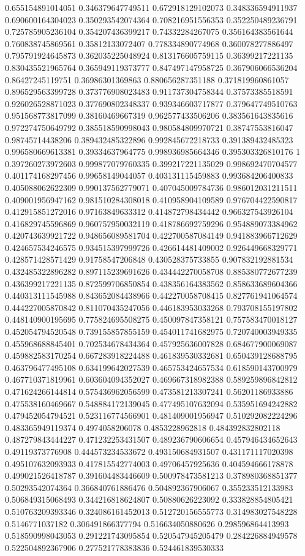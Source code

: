 \begin{table}
\begin{tabu}
\begin{sparkline}{10}
0.655154891014051 0.346379647749511 0.672918129102073 0.348336594911937 0.690600164304023 0.350293542074364 0.708216951556353 0.352250489236791 0.725785905236104 0.354207436399217 0.74332284267075 0.356164383561644 0.760838745869561 0.35812133072407 0.778334890774968 0.360078277886497 0.795791924645873 0.362035225048924 0.813176605759115 0.36399217221135 0.830435521965764 0.365949119373777 0.847497147958725 0.367906066536204 0.86427245119751 0.36986301369863 0.880656287351188 0.371819960861057 0.896529563399728 0.373776908023483 0.911737304758344 0.37573385518591 0.926026528871023 0.377690802348337 0.939346603717877 0.379647749510763 0.951568773817099 0.38160469667319 0.962577433506206 0.383561643835616 0.972274750649792 0.385518590998043 0.980584809970721 0.38747553816047 0.98745714438206 0.389432485322896 0.992845672218733 0.391389432485323 0.996580669613381 0.39334637964775 0.998936985664346 0.395303326810176 1 0.397260273972603 0.999877079760335 0.399217221135029 0.998692470704577 0.401174168297456 0.99658149044057 0.403131115459883 0.993684206400833 0.405088062622309 0.990137562779071 0.407045009784736 0.986012031211511 0.409001956947162 0.981510284308018 0.410958904109589 0.976704422590817 0.412915851272016 0.97163849633312 0.414872798434442 0.966327543926104 0.416829745596869 0.960757950032119 0.418786692759296 0.954889073384962 0.420743639921722 0.948656089581704 0.422700587084149 0.941883966712629 0.424657534246575 0.934515397999726 0.426614481409002 0.926449668329771 0.428571428571429 0.91758547206848 0.430528375733855 0.907832192881534 0.432485322896282 0.897115239691626 0.434442270058708 0.885380772677239 0.436399217221135 0.872599706850854 0.438356164383562 0.858633689604366 0.440313111545988 0.843652084438966 0.442270058708415 0.827761941064574 0.444227005870842 0.811070435247056 0.446183953033268 0.793708155197802 0.448140900195695 0.775824695508275 0.450097847358121 0.757583470018127 0.452054794520548 0.739155857855159 0.454011741682975 0.720740003949335 0.455968688845401 0.702534678434364 0.457925636007828 0.684677900069087 0.459882583170254 0.667283918224488 0.461839530332681 0.650439128688795 0.463796477495108 0.634199642027539 0.465753424657534 0.618590143700979 0.467710371819961 0.603604094352027 0.469667318982388 0.589259896842812 0.471624266144814 0.575436962056599 0.473581213307241 0.56201186933886 0.475538160469667 0.548884172139045 0.477495107632094 0.535951694242882 0.479452054794521 0.523116774566901 0.481409001956947 0.510292082224296 0.483365949119374 0.4974058206078 0.4853228962818 0.484392832802118 0.487279843444227 0.471232253431507 0.489236790606654 0.457946434652643 0.49119373776908 0.444573234533672 0.493150684931507 0.431171117020398 0.495107632093933 0.417815542774003 0.49706457925636 0.404594666178878 0.499021526418787 0.391604483446609 0.500978473581213 0.378980368851377 0.50293542074364 0.366840761886476 0.504892367906067 0.355233512133983 0.506849315068493 0.344216818624807 0.50880626223092 0.333828854805421 0.510763209393346 0.324086161452013 0.512720156555773 0.314983027548228 0.5146771037182 0.306491866377794 0.516634050880626 0.298596864413993 0.518590998043053 0.291221743095854 0.520547945205479 0.284226884949578 0.522504892367906 0.277521778383836 0.524461839530333 
\end{sparkline}
\end{tabu}
\end{table}
